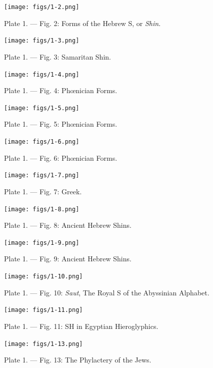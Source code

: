 \documentclass[a4paper, 11pt, oneside, english, landscape, twocolumn]{article}
\begin{document}
\begin{figure}[H]
\centering
\texttt{[image: figs/1-2.png]}
\caption{Plate 1. --- Fig. 2: Forms of the Hebrew S, or \emph{Shin}.}
\end{figure}

\begin{figure}[H]
\centering
\texttt{[image: figs/1-3.png]}
\caption{Plate 1. --- Fig. 3: Samaritan Shin.}
\end{figure}

\begin{figure}[H]
\centering
\texttt{[image: figs/1-4.png]}
\caption{Plate 1. --- Fig. 4: Phœnician Forms.}
\end{figure}

\begin{figure}[H]
\centering
\texttt{[image: figs/1-5.png]}
\caption{Plate 1. --- Fig. 5: Phœnician Forms.}
\end{figure}

\begin{figure}[H]
\centering
\texttt{[image: figs/1-6.png]}
\caption{Plate 1. --- Fig. 6: Phœnician Forms.}
\end{figure}

\begin{figure}[H]
\centering
\texttt{[image: figs/1-7.png]}
\caption{Plate 1. --- Fig. 7: Greek.}
\end{figure}

\begin{figure}[H]
\centering
\texttt{[image: figs/1-8.png]}
\caption{Plate 1. --- Fig. 8: Ancient Hebrew Shins.}
\end{figure}

\begin{figure}[H]
\centering
\texttt{[image: figs/1-9.png]}
\caption{Plate 1. --- Fig. 9: Ancient Hebrew Shins.}
\end{figure}

\begin{figure}[H]
\centering
\texttt{[image: figs/1-10.png]}
\caption{Plate 1. --- Fig. 10: \emph{Saut}, The Royal S of the Abyssinian Alphabet.}
\end{figure}

\begin{figure}[H]
\centering
\texttt{[image: figs/1-11.png]}
\caption{Plate 1. --- Fig. 11: SH in Egyptian Hieroglyphics.}
\end{figure}

\begin{figure}[H]
\centering
\texttt{[image: figs/1-13.png]}
\caption{Plate 1. --- Fig. 13: The Phylactery of the Jews.}
\end{figure}
\end{document}
